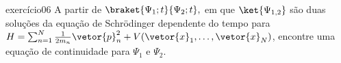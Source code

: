 \begin{exercício}{}{exercício06}
    A partir de \(\braket{\Psi_1; t}{\Psi_2; t},\) em que \(\ket{\Psi_{1,2}}\) são duas soluções da equação de Schrödinger dependente do tempo para \(H = \sum_{n=1}^N \frac{1}{2m_n} \vetor{p}_n^2 + V(\vetor{x}_1, \dots, \vetor{x}_N)\), encontre uma equação de continuidade para \(\Psi_1\) e \(\Psi_2\).
\end{exercício}
